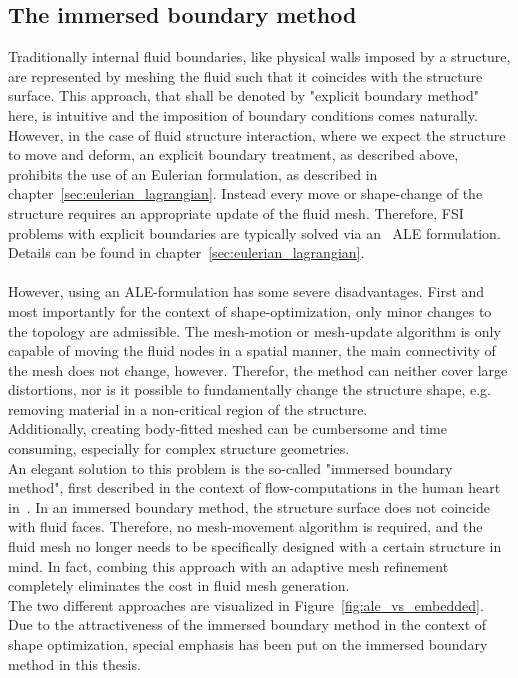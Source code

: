 \documentclass[../main.tex]{subfiles}
\begin{document}
\subsection{The immersed boundary method}\label{sec:immersed_boundaries}
Traditionally internal fluid boundaries, like physical walls imposed by a structure, are represented by meshing the fluid such that it coincides with the structure surface. This approach, that shall be denoted by "explicit boundary method" here, is intuitive and the imposition of boundary conditions comes naturally.
However, in the case of fluid structure interaction, where we expect the structure to move and deform, an explicit boundary treatment, as described above, prohibits the use of an Eulerian formulation, as described in chapter~\ref{sec:eulerian_lagrangian}. Instead every move or shape-change of the structure requires an appropriate update of the fluid mesh. Therefore, \ac{FSI} problems with explicit boundaries are typically solved via an \
\ac{ALE} formulation. Details can be found in chapter~\ref{sec:eulerian_lagrangian}.\\
  \\
However, using an \ac{ALE}-formulation has some severe disadvantages. First and most importantly for the context of shape-optimization, only minor changes to the topology are admissible. The mesh-motion or mesh-update algorithm is only capable of moving the fluid nodes in a spatial manner, the main connectivity of the mesh does not change, however. Therefor, the method can neither cover large distortions, nor is it possible to fundamentally change the structure shape, e.g. removing material in a non-critical region of the structure.\\
Additionally, creating body-fitted meshed can be cumbersome and time consuming, especially for complex structure geometries.\\
An elegant solution to this problem is the so-called "immersed boundary method", first described in the context of flow-computations in the human heart in~\cite{Peskin1972}. In an immersed boundary method, the structure surface does not coincide with fluid faces. Therefore, no mesh-movement algorithm is required, and the fluid mesh no longer needs to be specifically designed with a certain structure in mind. In fact, combing this approach with an adaptive mesh refinement completely eliminates the cost in fluid mesh generation.\\
The two different approaches are visualized in Figure~\ref{fig:ale_vs_embedded}.
Due to the attractiveness of the immersed boundary method in the context of shape optimization, special emphasis has been put on the immersed boundary method in this thesis.
\end{document}
